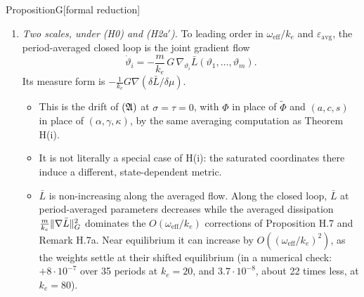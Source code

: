 \begin{thm}{Proposition}{G}[formal reduction]
\mbox{}
\begin{enumerate}[label=(\alph*),leftmargin=2.2em]
  \item[\textup{(a)}] \emph{Two scales, under \textup{(H0)} and \textup{(H2a$'$)}.} To leading order in
    $\omega_{\mathrm{eff}}/k_e$ and $\varepsilon_{\mathrm{avg}}$, the period-averaged closed loop is the joint gradient
    flow
    \begin{equation}\label{eq:propG:joint}
      \dot\vartheta_i = -\frac{m}{k_e}\,G\,\nabla_{\vartheta_i}\bar L(\vartheta_1,\dots,\vartheta_m).
    \end{equation}
    Its measure form is $-\frac{1}{k_e}G\nabla(\delta\bar L/\delta\mu)$.
    \begin{itemize}
      \item This is the drift of $(\mathfrak{A})$ at $\sigma = \tau = 0$, with $\Phi$ in place of $\tilde\Phi$ and $(a,c,s)$
        in place of $(\alpha,\gamma,\kappa)$, by the same averaging computation as Theorem H(i).
      \item It is not literally a special case of H(i): the saturated coordinates there induce a different,
        state-dependent metric.
      \item $\bar L$ is non-increasing along the averaged flow. Along the closed loop, $\bar L$ at period-averaged
        parameters decreases while the averaged dissipation $\frac{m}{k_e}\lVert \nabla\bar L\rVert_G^2$ dominates the
        $O(\omega_{\mathrm{eff}}/k_e)$ corrections of Proposition H.7 and Remark H.7a. Near equilibrium it can
        increase by $O((\omega_{\mathrm{eff}}/k_e)^2)$, as the weights settle at their shifted equilibrium (in a
        numerical check: $+8\cdot10^{-7}$ over 35 periods at $k_e = 20$, and $3.7\cdot10^{-8}$, about 22 times less,
        at $k_e = 80$).
    \end{itemize}


\end{enumerate}
\end{thm}
